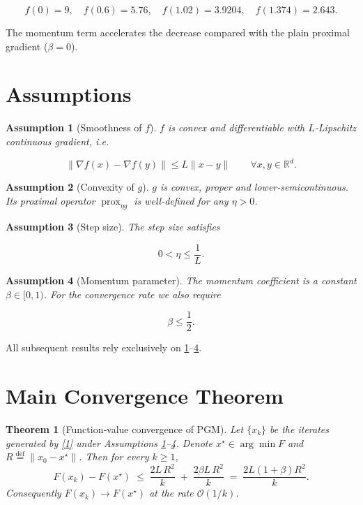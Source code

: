 \documentclass[11pt]{article}
\newtheorem{theorem}{Theorem}[section]
\newtheorem{assumption}{Assumption}[section]
\begin{document}
\[
f(0)=9,\quad f(0.6)=5.76,\quad f(1.02)=3.9204,\quad f(1.374)=2.643.
\]

The momentum term accelerates the decrease compared with the plain proximal gradient ($\beta=0$).

\section*{Assumptions}
\begin{assumption}[Smoothness of $f$]\label{ass:smooth}
$f$ is convex and differentiable with $L$‑Lipschitz continuous gradient, i.e.  

\[
\|\nabla f(x)-\nabla f(y)\|\le L\|x-y\|\qquad\forall x,y\in\mathbb{R}^{d}.
\tag{A1}
\]
\end{assumption}

\begin{assumption}[Convexity of $g$]\label{ass:convexg}
$g$ is convex, proper and lower‑semicontinuous. Its proximal operator $\operatorname{prox}_{\eta g}$ is well‑defined for any $\eta>0$.
\end{assumption}

\begin{assumption}[Step size]\label{ass:stepsize}
The step size satisfies  

\[
0<\eta\le\frac{1}{L}.
\tag{A3}
\]

\end{assumption}

\begin{assumption}[Momentum parameter]\label{ass:beta}
The momentum coefficient is a constant $\beta\in[0,1)$.  For the convergence rate we also require  

\[
\beta\le\frac{1}{2}.
\tag{A4}
\]
\end{assumption}

All subsequent results rely exclusively on \ref{ass:smooth}–\ref{ass:beta}.

\section*{Main Convergence Theorem}
\begin{theorem}[Function‑value convergence of PGM]\label{thm:main}
Let $\{x_{k}\}$ be the iterates generated by \eqref{1} under Assumptions \ref{ass:smooth}–\ref{ass:beta}.  
Denote $x^{\star}\in\arg\min F$ and $R\stackrel{\mathrm{def}}{=}\|x_{0}-x^{\star}\|$.  
Then for every $k\ge 1$,
\[
F(x_{k})-F(x^{\star})\;\le\;
\frac{2L\,R^{2}}{k}\;+\;\frac{2\beta L\,R^{2}}{k}\;=\;\frac{2L(1+\beta)R^{2}}{k}.
\tag{2}
\]
Consequently $F(x_{k})\to F(x^{\star})$ at the rate $\mathcal{O}(1/k)$.
\end{theorem}
\end{document}

